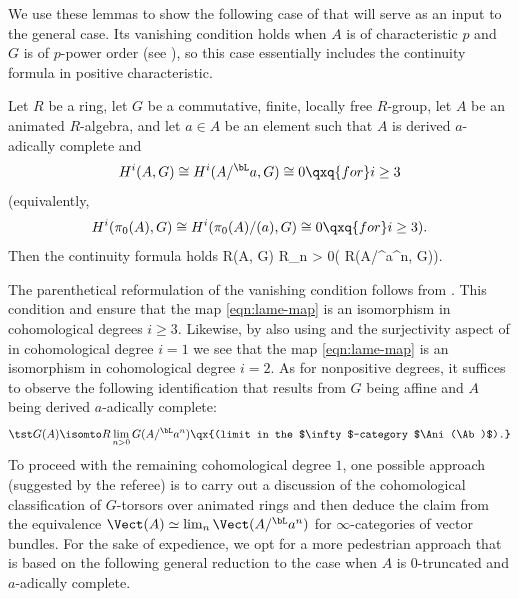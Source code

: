 We use these lemmas to show the following case of  that will serve as an input to the general case. Its vanishing condition holds when $A$ is of characteristic $p$ and $G$ is of $p$-power order (see ), so this case essentially includes the continuity formula in positive characteristic.


\blem \label{lem:lame-case}
Let $R$ be a ring, let $G$ be a commutative, finite, locally free $R$-group, let $A$ be an animated $R$-algebra, and let $a \in A$ be an element such that $A$ is derived $a$-adically complete and
\[
H^{i}(A, G) \cong H^i(A/^\bL a, G) \cong 0 \qxq{for} i \ge 3
\]
{\upshape(}equivalently,
\[
H^{i}(\pi_0(A), G) \cong H^i(\pi_0(A)/(a), G) \cong 0 \qxq{for} i \ge 3).
\]
Then the continuity formula holds\ucolon
\be \label{eqn:lame-map}
\tst R\Gamma(A, G) \isomto R\lim_{n > 0}( R\Gamma(A/^\bL a^n, G)).
\ee
\elem

\bpf
The parenthetical reformulation of the vanishing condition follows from . This condition and  ensure that the map \eqref{eqn:lame-map} is an isomorphism in cohomological degrees $i \ge 3$. Likewise, by also using  and the surjectivity aspect of  in cohomological degree $i = 1$ we see that the map \eqref{eqn:lame-map} is an isomorphism in cohomological degree $i = 2$. As for nonpositive degrees, it suffices to observe the following identification that results from $G$ being affine and $A$ being derived $a$-adically complete:
\[
\tst G(A) \isomto R\lim_{n > 0} G(A/^\bL a^n) \qx{(limit in the $\infty$-category $\Ani(\Ab)$).}
\]
To proceed with the remaining cohomological degree $1$, one possible approach (suggested by the referee) is to carry out a discussion of the cohomological classification of $G$-torsors over animated rings and then deduce the claim from the equivalence $\Vect(A) \simeq \lim_n \Vect(A/^\bL a^n)$ for $\infty$-categories of vector bundles. For the sake of expedience, we opt for a more pedestrian approach that is based on the following general reduction to the case when $A$ is $0$-truncated and $a$-adically complete.


